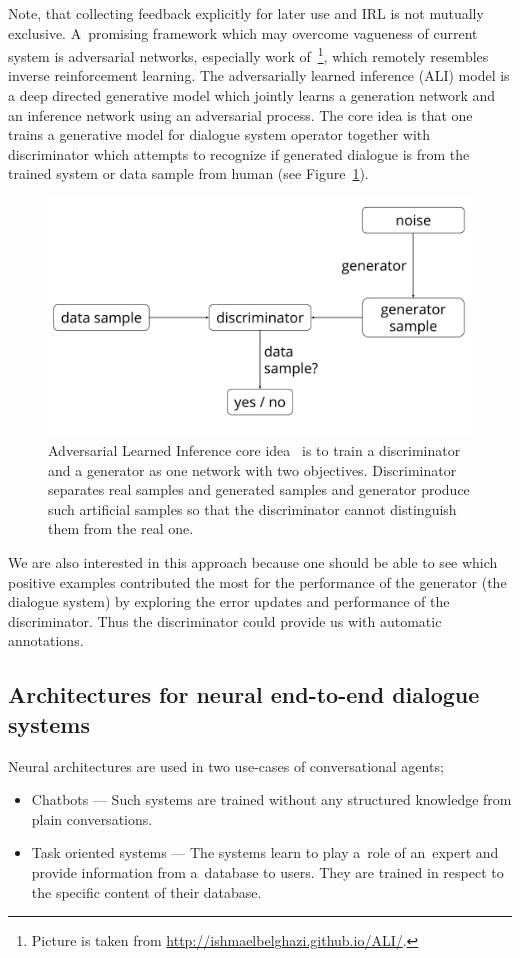 \documentclass[11pt]{article}
\begin{document}
Note, that collecting feedback explicitly for later use and IRL is not mutually exclusive.
A~promising framework which may overcome vagueness of current system is adversarial networks, especially work of~\cite{dumoulin_adversarially_2016}\footnote{Picture is taken from \url{http://ishmaelbelghazi.github.io/ALI/}.}, which remotely resembles inverse reinforcement learning.
The adversarially learned inference (ALI) model is a deep directed generative model which jointly learns a generation network and an inference network using an adversarial process. 
The core idea is that one trains a generative model for dialogue system operator together with discriminator which attempts to recognize if generated dialogue is from the trained system or data sample from human (see Figure~\ref{fig:gan}).

\begin{figure}[htb]
    \centering
    \includegraphics[width=0.8\linewidth]{gan_simple}
    \caption{Adversarial Learned Inference core idea~\cite{dumoulin_adversarially_2016} is to train a discriminator and a generator as one network with two objectives. 
    Discriminator separates real samples and generated samples and generator produce such artificial samples so that the discriminator cannot distinguish them from the real one.}
\label{fig:gan}
\end{figure}

We are also interested in this approach because one should be able to see which positive examples contributed the most for the performance of the generator (the dialogue system) by exploring the error updates and performance of the discriminator.
Thus the discriminator could provide us with automatic annotations. 

\subsection{Architectures for neural end-to-end dialogue systems}
\label{sub:nn_architectures}
Neural architectures are used in two use-cases of conversational agents;
\begin{itemize}
    \item Chatbots --- Such systems are trained without any structured knowledge from plain conversations.
    \item Task oriented systems --- The systems learn to play a~role of an~expert and provide information from a~database to users.
        They are trained in respect to the specific content of their database.
\end{itemize}
\end{document}

